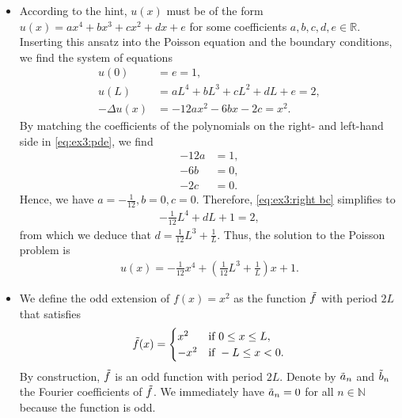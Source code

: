 \documentclass[11pt]{article}
\begin{document}
\begin{solution}  
    \begin{itemize}
        \item According to the hint, $u(x)$ must be of the form $u(x) = a x^4 + b x^3 + c x^2 + d x + e$ for some coefficients $a,b,c,d,e \in \mathbb R$.
        Inserting this ansatz into the Poisson equation and the boundary conditions, we find the system of equations
        \begin{align}
            u(0) &= e = 1, \label{eq:ex3:left bc}\\
            u(L) &= a L^4 + b L^3 + c L^2 + d L + e = 2, \label{eq:ex3:right bc}\\
            - \Delta u(x) &= - 12 a x^2 - 6 b x - 2 c = x^2. \label{eq:ex3:pde}
        \end{align}
        By matching the coefficients of the polynomials on the right- and left-hand side in \eqref{eq:ex3:pde}, we find
        \begin{align*}
            - 12 a &= 1,\\
            - 6 b &= 0,\\
            - 2 c &= 0.
        \end{align*}
        Hence, we have $a = -\frac{1}{12}, b = 0, c = 0$. Therefore, \eqref{eq:ex3:right bc} simplifies to
        \begin{align*}
            -\frac{1}{12} L^4 + dL + 1 = 2,
        \end{align*}
        from which we deduce that $d = \frac{1}{12} L^3 + \frac{1}{L}$. Thus, the solution to the Poisson problem is
        \begin{align*}
            u(x) = -\frac{1}{12} x^4 + \left(\frac{1}{12} L^3 + \frac{1}{L}\right) x + 1.
        \end{align*}
        \item We define the odd extension of $f(x) = x^2$ as the function $\Tilde{f}$ with period $2L$ that satisfies 
        \begin{align*}
            \Tilde{f}(x) = \begin{cases}
                x^2 & \text{if } 0 \leq x \leq L,\\
                -x^2 & \text{if } -L \leq x < 0.
            \end{cases}
        \end{align*}
        By construction, $\Tilde f$ is an odd function with period $2L$. Denote by $\Tilde{a}_n$ and $\Tilde{b}_n$ the Fourier coefficients of $\Tilde{f}$.
        We immediately have $\Tilde{a}_n = 0$ for all $n \in \mathbb N$ because the function is odd.

\end{itemize}
\end{solution}
\end{document}
